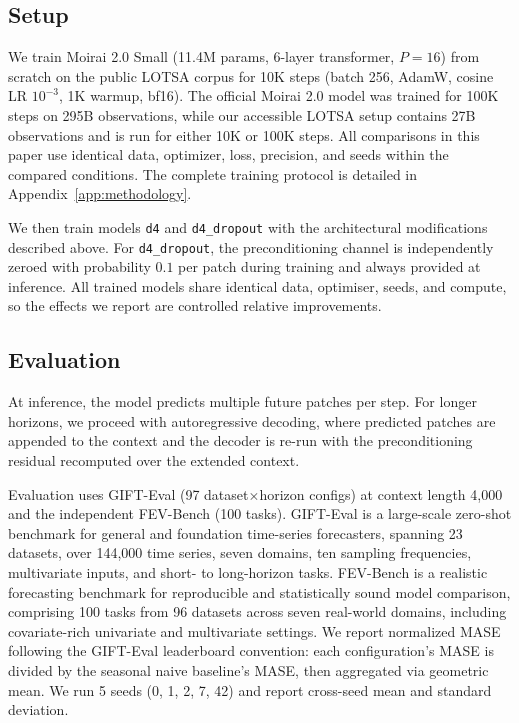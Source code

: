 \documentclass{article}
\begin{document}
\subsection{Setup}

We train Moirai 2.0 Small \citep{liu2024moirai2} (11.4M params, 6-layer transformer, $P{=}16$) from scratch on the public LOTSA corpus \citep{woo2024unified} for 10K steps (batch 256, AdamW, cosine LR $10^{-3}$, 1K warmup, bf16). The official Moirai 2.0 model was trained for 100K steps on 295B observations, while our accessible LOTSA setup contains 27B observations and is run for either 10K or 100K steps. All comparisons in this paper use identical data, optimizer, loss, precision, and seeds within the compared conditions. The complete training protocol is detailed in Appendix~\ref{app:methodology}.

We then train models \texttt{d4} and \texttt{d4\_dropout} with the architectural modifications described above. For \texttt{d4\_dropout}, the preconditioning channel is independently zeroed with probability $0.1$ per patch during training and always provided at inference. All trained models share identical data, optimiser, seeds, and compute, so the effects we report are controlled relative improvements.

\subsection{Evaluation}

At inference, the model predicts multiple future patches per step. For longer horizons, we proceed with autoregressive decoding, where predicted patches are appended to the context and the decoder is re-run with the preconditioning residual recomputed over the extended context.

Evaluation uses GIFT-Eval \citep{vijay2024gifteval} (97 dataset$\times$horizon configs) at context length 4{,}000 and the independent FEV-Bench \citep{shchur2025fevbench} (100 tasks). GIFT-Eval is a large-scale zero-shot benchmark for general and foundation time-series forecasters, spanning 23 datasets, over 144{,}000 time series, seven domains, ten sampling frequencies, multivariate inputs, and short- to long-horizon tasks. FEV-Bench is a realistic forecasting benchmark for reproducible and statistically sound model comparison, comprising 100 tasks from 96 datasets across seven real-world domains, including covariate-rich univariate and multivariate settings. We report normalized MASE following the GIFT-Eval leaderboard convention: each configuration's MASE is divided by the seasonal naive baseline's MASE, then aggregated via geometric mean. We run 5 seeds (0, 1, 2, 7, 42) and report cross-seed mean and standard deviation.
\end{document}
